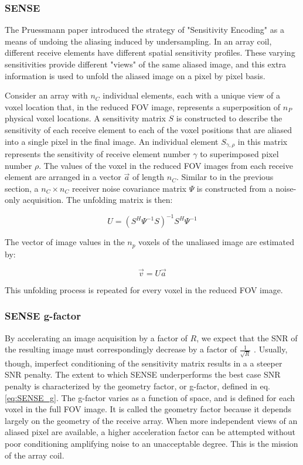 \subsubsection{SENSE}
The Pruessmann paper \cite{Pruessmann1999} introduced the strategy of "Sensitivity Encoding" as a means of undoing the
aliasing induced by undersampling. In an array coil, different receive elements have different spatial sensitivity
profiles. These varying sensitivities provide different "views" of the same aliased image, and this extra information is
used to unfold the aliased image on a pixel by pixel basis.

Consider an array with $n_C$ individual elements, each with a unique view of a voxel location that, in the reduced FOV
image, represents a superposition of $n_P$ physical voxel locations. A sensitivity matrix $S$ is constructed to describe
the sensitivity of each receive element to each of the voxel positions that are aliased into a single pixel in the final
image. An individual element $S_{\gamma,\rho}$ in this matrix represents the sensitivity of receive element number
$\gamma$ to superimposed pixel number $\rho$. The values of the voxel in the reduced FOV images from each receive
element are arranged in a vector $\vec{a}$ of length $n_C$. Similar to in the previous section, a $n_C \times n_C$
receiver noise covariance matrix $\Psi$ is constructed from a noise-only acquisition. The unfolding matrix is then:

\begin{equation}\label{eq:unfolding}
    U = (S^H\Psi^{-1}S)^{-1}S^H\Psi^{-1}
\end{equation}

The vector of image values in the $n_p$ voxels of the unaliased image are estimated by:

\begin{equation}
    \vec{v} = U\vec{a}
\end{equation}

This unfolding process is repeated for every voxel in the reduced FOV image.

\subsubsection{SENSE g-factor}
By accelerating an image acquisition by a factor of $R$, we expect that the SNR of the resulting image must
correspondingly decrease by a factor of $\frac{1}{\sqrt{R}}$ \cite{nishimura}. Usually, though, imperfect conditioning
of the sensitivity matrix results in a a steeper SNR penalty. The extent to which SENSE underperforms the best case SNR
penalty is characterized by the geometry factor, or g-factor, defined in eq. \ref{eq:SENSE_g}. The g-factor varies as a
function of space, and is defined for each voxel in the full FOV image. It is called the geometry factor because it
depends largely on the geometry of the receive array. When more independent views of an aliased pixel are available, a
higher acceleration factor can be attempted without poor conditioning amplifying noise to an unacceptable degree. This
is the mission of the array coil.

